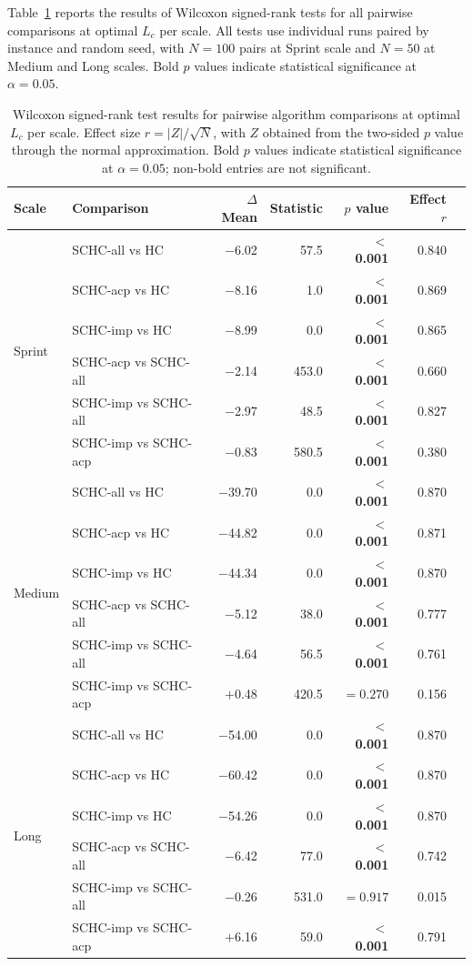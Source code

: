 \documentclass[12pt, a4paper, oneside]{report}
\begin{document}
Table~\ref{tab:wilcoxon} reports the results of Wilcoxon signed-rank tests
for all pairwise comparisons at optimal $L_c$ per scale. All tests use
individual runs paired by instance and random seed, with $N = 100$
pairs at Sprint scale and $N = 50$ at Medium and Long scales. Bold $p$ values indicate statistical significance
at $\alpha = 0.05$.


\begin{table}[H]
\centering
\caption{Wilcoxon signed-rank test results for pairwise algorithm
comparisons at optimal $L_c$ per scale. Effect size
$r = |Z|/\sqrt{N}$, with $Z$ obtained from the two-sided $p$ value
through the normal approximation. Bold $p$ values indicate
statistical significance at $\alpha = 0.05$; non-bold entries are
not significant.}
\label{tab:wilcoxon}
\small
\begin{tabular}{llrrrrr}
\toprule
Scale & Comparison & $\Delta$ Mean & Statistic & $p$ value & Effect $r$ \\
\midrule
\multirow{6}{*}{Sprint}
  & SCHC-all vs HC       & $-$6.02 & 57.5  & \textbf{$<$ 0.001} & 0.840 \\
  & SCHC-acp vs HC       & $-$8.16 & 1.0   & \textbf{$<$ 0.001} & 0.869 \\
  & SCHC-imp vs HC       & $-$8.99 & 0.0   & \textbf{$<$ 0.001} & 0.865 \\
  & SCHC-acp vs SCHC-all & $-$2.14 & 453.0 & \textbf{$<$ 0.001} & 0.660 \\
  & SCHC-imp vs SCHC-all & $-$2.97 & 48.5  & \textbf{$<$ 0.001} & 0.827 \\
  & SCHC-imp vs SCHC-acp & $-$0.83 & 580.5 & \textbf{$<$ 0.001} & 0.380 \\
\midrule
\multirow{6}{*}{Medium}
  & SCHC-all vs HC       & $-$39.70 & 0.0  & \textbf{$<$ 0.001} & 0.870 \\
  & SCHC-acp vs HC       & $-$44.82 & 0.0  & \textbf{$<$ 0.001} & 0.871 \\
  & SCHC-imp vs HC       & $-$44.34 & 0.0  & \textbf{$<$ 0.001} & 0.870 \\
  & SCHC-acp vs SCHC-all & $-$5.12  & 38.0 & \textbf{$<$ 0.001} & 0.777 \\
  & SCHC-imp vs SCHC-all & $-$4.64  & 56.5 & \textbf{$<$ 0.001} & 0.761 \\
  & SCHC-imp vs SCHC-acp & $+$0.48  & 420.5 & $= 0.270$          & 0.156 \\
\midrule
\multirow{6}{*}{Long}
  & SCHC-all vs HC       & $-$54.00 & 0.0  & \textbf{$<$ 0.001} & 0.870 \\
  & SCHC-acp vs HC       & $-$60.42 & 0.0  & \textbf{$<$ 0.001} & 0.870 \\
  & SCHC-imp vs HC       & $-$54.26 & 0.0  & \textbf{$<$ 0.001} & 0.870 \\
  & SCHC-acp vs SCHC-all & $-$6.42  & 77.0 & \textbf{$<$ 0.001} & 0.742 \\
  & SCHC-imp vs SCHC-all & $-$0.26  & 531.0 & $= 0.917$          & 0.015 \\
  & SCHC-imp vs SCHC-acp & $+$6.16  & 59.0 & \textbf{$<$ 0.001} & 0.791 \\
\bottomrule
\end{tabular}
\end{table}
\end{document}
